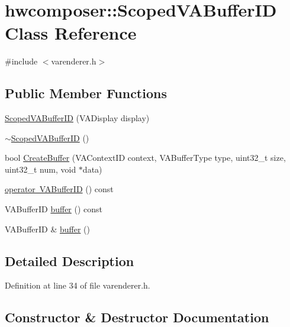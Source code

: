 \hypertarget{classhwcomposer_1_1ScopedVABufferID}{}\section{hwcomposer\+:\+:Scoped\+V\+A\+Buffer\+ID Class Reference}
\label{classhwcomposer_1_1ScopedVABufferID}


{\ttfamily \#include $<$varenderer.\+h$>$}

\subsection*{Public Member Functions}
\begin{DoxyCompactItemize}
\item 
\mbox{\hyperlink{classhwcomposer_1_1ScopedVABufferID_add5661b918c947ec845a2305e759493f}{Scoped\+V\+A\+Buffer\+ID}} (V\+A\+Display display)
\item 
\mbox{\hyperlink{classhwcomposer_1_1ScopedVABufferID_ab65a90a95ce0fd4e661086cdbad8fff9}{$\sim$\+Scoped\+V\+A\+Buffer\+ID}} ()
\item 
bool \mbox{\hyperlink{classhwcomposer_1_1ScopedVABufferID_a180ba4428678cb4206539af1eed5193c}{Create\+Buffer}} (V\+A\+Context\+ID context, V\+A\+Buffer\+Type type, uint32\+\_\+t size, uint32\+\_\+t num, void $\ast$data)
\item 
\mbox{\hyperlink{classhwcomposer_1_1ScopedVABufferID_a2ecadd61dd682c9ff200d701e4e4c59f}{operator V\+A\+Buffer\+ID}} () const
\item 
V\+A\+Buffer\+ID \mbox{\hyperlink{classhwcomposer_1_1ScopedVABufferID_addd0a1e123031e370d1ff6e42f579132}{buffer}} () const
\item 
V\+A\+Buffer\+ID \& \mbox{\hyperlink{classhwcomposer_1_1ScopedVABufferID_a355ed1e666eefa3216225eab3a2dfedb}{buffer}} ()
\end{DoxyCompactItemize}


\subsection{Detailed Description}


Definition at line 34 of file varenderer.\+h.



\subsection{Constructor \& Destructor Documentation}
\mbox{\label{classhwcomposer_1_1ScopedVABufferID_add5661b918c947ec845a2305e759493f}} 
